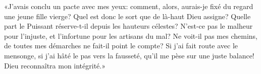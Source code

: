 «J’avais conclu un pacte avec mes yeux:
	comment, alors, aurais-je fixé du regard une jeune fille vierge?
Quel est donc le sort que de là-haut Dieu assigne?
Quelle part le Puissant réserve-t-il depuis les hauteurs célestes?
N’est-ce pas le malheur pour l’injuste, et l’infortune pour les artisans du mal?
Ne voit-il pas mes chemins, de toutes mes démarches ne fait-il point le compte?
Si j’ai fait route avec le mensonge, si j’ai hâté le pas vers la fausseté,
	qu’il me pèse sur une juste balance! Dieu reconnaîtra mon intégrité.»
